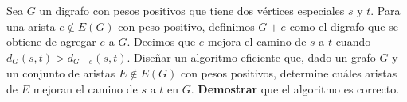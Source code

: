 
  \item Sea $G$ un digrafo con pesos positivos que tiene dos vértices especiales $s$ y $t$.  Para una arista $e \not\in E(G)$ con peso positivo, definimos $G + e$ como el digrafo que se obtiene de agregar $e$ a $G$.  Decimos que $e$ mejora el camino de $s$ a $t$ cuando $d_G(s, t) > d_{G+e}(s,t)$.  Diseñar un algoritmo eficiente que, dado un grafo $G$ y un conjunto de aristas $E \not\in E(G)$ con pesos positivos, determine cuáles aristas de $E$ mejoran el camino de $s$ a $t$ en $G$. \textbf{Demostrar} que el algoritmo es correcto.

